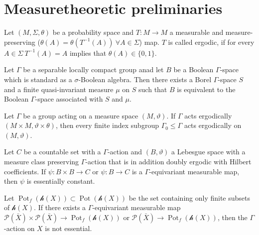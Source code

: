 \section{Measuretheoretic preliminaries}
\label{sec:measure}

\begin{defin}
  Let \((M, \Sigma, \theta)\) be a probability space and \(T\colon M \to M\) a measurable and measure-preserving (\(\theta(A) = \theta(T^{-1}(A)) \ \forall A \in \Sigma\)) map. \(T\) is called ergodic, if for every \(A \in \Sigma\ T^{-1}(A) = A\) implies that \(\theta(A) \in \{0, 1\}\).
\end{defin}

\begin{thm}
  Let \(\Gamma\) be a separable locally compact group anad let \(B\) be a Boolean \(\Gamma\)-space which is standard as a \(\sigma\)-Boolean algebra. Then there exists a Borel \(\Gamma\)-space \(S\) and a finite quasi-invariant measure \(\mu\) on \(S\) such that \(B\) is equivalent to the Boolean  \(\Gamma\)-space associated with \(S\) and \(\mu\).
\end{thm}

\begin{lemma}[{\cite[Lem 4.3]{MR3509968}}]
  Let \(\Gamma\) be a group acting on a measure space \((M, \vartheta)\). If \(\Gamma\) acts ergodically \((M \times M, \vartheta \times \theta)\), then every  finite index subgroup \(\Gamma_0 \leq \Gamma\) acts ergodically on \((M, \vartheta)\).
\end{lemma}

\begin{lemma}[{\cite[Lem. 4.4]{MR3509968}}]
  Let \(C\) be a countable set with a \(\Gamma\)-action and \((B, \vartheta)\) a Lebesgue space with a measure class preserving \(\Gamma\)-action that is in addition doubly ergodic with Hilbert coefficients. If \(\psi \colon B \times B \to C\) or \(\psi \colon B \to C\) is a \(\Gamma\)-equivariant measurable map, then \(\psi\) is essentially constant.
\end{lemma}

\begin{cor}[{\cite[Cor. 4.5]{MR3509968}}]
  Let \(\operatorname{Pot}_f(\mathcal{h}(X)) \subset \operatorname{Pot}(\mathcal{h}(X))\) be the set containing only finite subsets of \(\mathcal{h}(X)\). If there exists a \(\Gamma\)-equivariant measurable map \(\mathcal{P}(\bar X) \times \mathcal{P}(\bar X) \to \operatorname{Pot}_f(\mathcal{h}(X))\) or \(\mathcal{P}(\bar X) \to \operatorname{Pot}_f(\mathcal{h}(X))\), then the \(\Gamma\)-action on \(X\) is not essential.
\end{cor}

